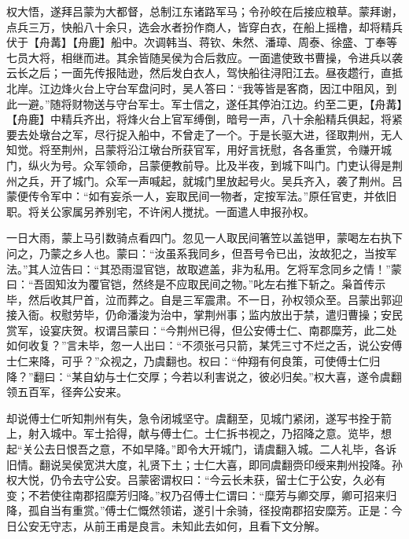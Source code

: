 权大悟，遂拜吕蒙为大都督，总制江东诸路军马；令孙皎在后接应粮草。蒙拜谢，点兵三万，快船八十余只，选会水者扮作商人，皆穿白衣，在船上摇橹，却将精兵伏于【舟冓】【舟鹿】船中。次调韩当、蒋钦、朱然、潘璋、周泰、徐盛、丁奉等七员大将，相继而进。其余皆随吴侯为合后救应。一面遣使致书曹操，令进兵以袭云长之后；一面先传报陆逊，然后发白衣人，驾快船往浔阳江去。昼夜趱行，直抵北岸。江边烽火台上守台军盘问时，吴人答曰：“我等皆是客商，因江中阻风，到此一避。”随将财物送与守台军士。军士信之，遂任其停泊江边。约至二更，【舟冓】【舟鹿】中精兵齐出，将烽火台上官军缚倒，暗号一声，八十余船精兵俱起，将紧要去处墩台之军，尽行捉入船中，不曾走了一个。于是长驱大进，径取荆州，无人知觉。将至荆州，吕蒙将沿江墩台所获官军，用好言抚慰，各各重赏，令赚开城门，纵火为号。众军领命，吕蒙便教前导。比及半夜，到城下叫门。门吏认得是荆州之兵，开了城门。众军一声喊起，就城门里放起号火。吴兵齐入，袭了荆州。吕蒙便传令军中：“如有妄杀一人，妄取民间一物者，定按军法。”原任官吏，并依旧职。将关公家属另养别宅，不许闲人搅扰。一面遣人申报孙权。

一日大雨，蒙上马引数骑点看四门。忽见一人取民间箸笠以盖铠甲，蒙喝左右执下问之，乃蒙之乡人也。蒙曰：“汝虽系我同乡，但吾号令已出，汝故犯之，当按军法。”其人泣告曰：“其恐雨湿官铠，故取遮盖，非为私用。乞将军念同乡之情！”蒙曰：“吾固知汝为覆官铠，然终是不应取民间之物。”叱左右推下斩之。枭首传示毕，然后收其尸首，泣而葬之。自是三军震肃。不一日，孙权领众至。吕蒙出郭迎接入衙。权慰劳毕，仍命潘浚为治中，掌荆州事；监内放出于禁，遣归曹操；安民赏军，设宴庆贺。权谓吕蒙曰：“今荆州已得，但公安傅士仁、南郡糜芳，此二处如何收复？”言未毕，忽一人出曰：“不须张弓只箭，某凭三寸不烂之舌，说公安傅士仁来降，可乎？”众视之，乃虞翻也。权曰：“仲翔有何良策，可使傅士仁归降？”翻曰：“某自幼与士仁交厚；今若以利害说之，彼必归矣。”权大喜，遂令虞翻领五百军，径奔公安来。

却说傅士仁听知荆州有失，急令闭城坚守。虞翻至，见城门紧闭，遂写书拴于箭上，射入城中。军士拾得，献与傅士仁。士仁拆书视之，乃招降之意。览毕，想起“关公去日恨吾之意，不如早降。”即令大开城门，请虞翻入城。二人礼毕，各诉旧情。翻说吴侯宽洪大度，礼贤下土；士仁大喜，即同虞翻赍印绶来荆州投降。孙权大悦，仍令去守公安。吕蒙密谓权曰：“今云长未获，留士仁于公安，久必有变；不若使往南郡招糜芳归降。”权乃召傅士仁谓曰：“糜芳与卿交厚，卿可招来归降，孤自当有重赏。”傅士仁慨然领诺，遂引十余骑，径投南郡招安糜芳。正是：今日公安无守志，从前王甫是良言。未知此去如何，且看下文分解。